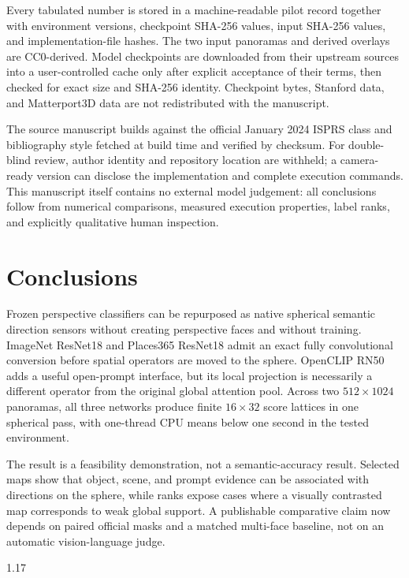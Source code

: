 \documentclass{isprs}
\begin{document}
Every tabulated number is stored in a machine-readable pilot record together
with environment versions, checkpoint SHA-256 values, input SHA-256 values,
and implementation-file hashes.  The two input panoramas and derived overlays
are CC0-derived.  Model checkpoints are downloaded from their upstream sources
into a user-controlled cache only after explicit acceptance of their terms,
then checked for exact size and SHA-256 identity.  Checkpoint bytes, Stanford
data, and Matterport3D data are not redistributed with the manuscript.

The source manuscript builds against the official January 2024 ISPRS class and
bibliography style fetched at build time and verified by checksum.  For
double-blind review, author identity and repository location are withheld; a
camera-ready version can disclose the implementation and complete execution
commands.  This manuscript itself contains no external model judgement: all
conclusions follow from numerical comparisons, measured execution properties,
label ranks, and explicitly qualitative human inspection.

\section{Conclusions}

Frozen perspective classifiers can be repurposed as native spherical semantic
direction sensors without creating perspective faces and without training.
ImageNet ResNet18 and Places365 ResNet18 admit an exact fully convolutional
conversion before spatial operators are moved to the sphere.  OpenCLIP RN50
adds a useful open-prompt interface, but its local projection is necessarily a
different operator from the original global attention pool.  Across two
$512\!\times\!1024$ panoramas, all three networks produce finite
$16\!\times\!32$ score lattices in one spherical pass, with one-thread CPU
means below one second in the tested environment.

The result is a feasibility demonstration, not a semantic-accuracy result.
Selected maps show that object, scene, and prompt evidence can be associated
with directions on the sphere, while ranks expose cases where a visually
contrasted map corresponds to weak global support.  A publishable comparative
claim now depends on paired official masks and a matched multi-face baseline,
not on an automatic vision-language judge.

{
\begin{spacing}{1.17}
\normalsize

\end{spacing}
}
\end{document}
